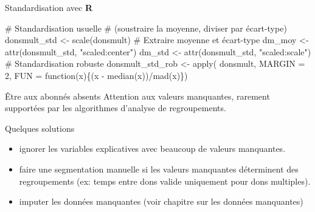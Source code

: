 \documentclass[
  ignorenonframetext,
]{beamer}
\newenvironment{Shaded}{\begin{snugshade}}{\end{snugshade}}
\newcommand{\AttributeTok}[1]{\textcolor[rgb]{0.40,0.45,0.13}{#1}}
\newcommand{\CommentTok}[1]{\textcolor[rgb]{0.37,0.37,0.37}{#1}}
\newcommand{\ControlFlowTok}[1]{\textcolor[rgb]{0.00,0.23,0.31}{#1}}
\newcommand{\DecValTok}[1]{\textcolor[rgb]{0.68,0.00,0.00}{#1}}
\newcommand{\FunctionTok}[1]{\textcolor[rgb]{0.28,0.35,0.67}{#1}}
\newcommand{\NormalTok}[1]{\textcolor[rgb]{0.00,0.23,0.31}{#1}}
\newcommand{\OtherTok}[1]{\textcolor[rgb]{0.00,0.23,0.31}{#1}}
\newcommand{\SpecialCharTok}[1]{\textcolor[rgb]{0.37,0.37,0.37}{#1}}
\newcommand{\StringTok}[1]{\textcolor[rgb]{0.13,0.47,0.30}{#1}}
\providecommand{\tightlist}{%
  \setlength{\itemsep}{0pt}\setlength{\parskip}{0pt}}\usepackage{longtable,booktabs,array}
\begin{document}
\begin{frame}[fragile]{Standardisation avec \textbf{R}}
\protect\hypertarget{standardisation-avec-r}{}
\begin{Shaded}
\begin{Highlighting}[numbers=left,,]
\CommentTok{\# Standardisation usuelle}
\CommentTok{\# (soustraire la moyenne, diviser par écart{-}type)}
\NormalTok{donsmult\_std }\OtherTok{\textless{}{-}} \FunctionTok{scale}\NormalTok{(donsmult)}
\CommentTok{\# Extraire moyenne et écart{-}type}
\NormalTok{dm\_moy }\OtherTok{\textless{}{-}} \FunctionTok{attr}\NormalTok{(donsmult\_std, }\StringTok{"scaled:center"}\NormalTok{)}
\NormalTok{dm\_std }\OtherTok{\textless{}{-}} \FunctionTok{attr}\NormalTok{(donsmult\_std, }\StringTok{"scaled:scale"}\NormalTok{)}
\CommentTok{\# Standardisation robuste}
\NormalTok{donsmult\_std\_rob }\OtherTok{\textless{}{-}} \FunctionTok{apply}\NormalTok{(}
\NormalTok{  donsmult,}
  \AttributeTok{MARGIN =} \DecValTok{2}\NormalTok{,}
  \AttributeTok{FUN =} \ControlFlowTok{function}\NormalTok{(x)\{(x }\SpecialCharTok{{-}} \FunctionTok{median}\NormalTok{(x))}\SpecialCharTok{/}\FunctionTok{mad}\NormalTok{(x)\})}
\end{Highlighting}
\end{Shaded}
\end{frame}

\begin{frame}{Être aux abonnés absents}
\protect\hypertarget{uxeatre-aux-abonnuxe9s-absents}{}
Attention aux valeurs manquantes, rarement supportées par les
algorithmes d'analyse de regroupements.

Quelques solutions

\begin{itemize}
\tightlist
\item
  ignorer les variables explicatives avec beaucoup de valeurs
  manquantes.
\item
  faire une segmentation manuelle si les valeurs manquantes déterminent
  des regroupements (ex: temps entre dons valide uniquement pour dons
  multiples).
\item
  imputer les données manquantes (voir chapitre sur les données
  manquantes)
\end{itemize}
\end{frame}
\end{document}
